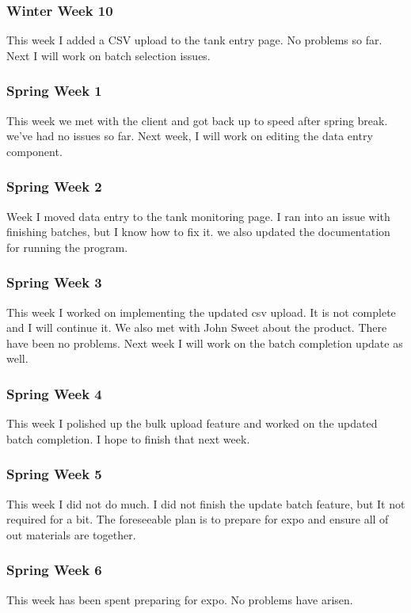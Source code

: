     \subsubsection{Winter Week 10}
        \noindent
        This week I added a CSV upload to the tank entry page.
        No problems so far.
        Next I will work on batch selection issues.
    \subsubsection{Spring Week 1}
        \noindent
        This week we met with the client and got back up to speed after spring break. we've had no issues so far. Next week, I will work on editing the data entry component. 
    \subsubsection{Spring Week 2}
        \noindent
        Week I moved data entry to the tank monitoring page. I ran into an issue with finishing batches, but I know how to fix it. we also updated the documentation for running the program. 
    \subsubsection{Spring Week 3}
        \noindent
        This week I worked on implementing the updated csv upload. It is not complete and I will continue it. We also met with John Sweet about the product.
        There have been no problems.
        Next week I will work on the batch completion update as well.
    \subsubsection{Spring Week 4}
        \noindent
        This week I polished up the bulk upload feature and worked on the updated batch completion.
        I hope to finish that next week.
    \subsubsection{Spring Week 5}
        \noindent
        This week I did not do much.
        I did not finish the update batch feature, but It not required for a bit.
        The foreseeable plan is to prepare for expo and ensure all of out materials are together.
    \subsubsection{Spring Week 6}
        \noindent
        This week has been spent preparing for expo.
        No problems have arisen.
        
